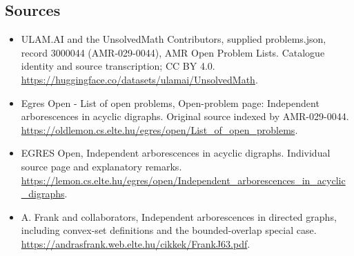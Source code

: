 \documentclass[11pt,a4paper]{article}
\begin{document}
\subsection{Sources}
\begin{itemize}
\item[S1] ULAM.AI and the UnsolvedMath Contributors, supplied problems.json, record 3000044 (AMR-029-0044), AMR Open Problem Lists. Catalogue identity and source transcription; CC BY 4.0.
\url{https://huggingface.co/datasets/ulamai/UnsolvedMath}.
\item[S2] Egres Open - List of open problems, Open-problem page: Independent arborescences in acyclic digraphs. Original source indexed by AMR-029-0044.
\url{https://oldlemon.cs.elte.hu/egres/open/List_of_open_problems}.
\item[S3] EGRES Open, Independent arborescences in acyclic digraphs. Individual source page and explanatory remarks.
\url{https://lemon.cs.elte.hu/egres/open/Independent_arborescences_in_acyclic_digraphs}.
\item[S4] A. Frank and collaborators, Independent arborescences in directed graphs, including convex-set definitions and the bounded-overlap special case.
\url{https://andrasfrank.web.elte.hu/cikkek/FrankJ63.pdf}.
\end{itemize}
\end{document}
